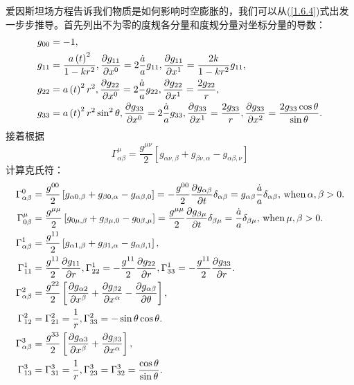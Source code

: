\documentclass[../天体物理基础.tex]{subfiles}
\begin{document}
爱因斯坦场方程告诉我们物质是如何影响时空膨胀的，我们可以从(\ref{1.6.4})式出发一步步推导。首先列出不为零的度规各分量和度规分量对坐标分量的导数：
\begin{align}
g_{00}&=-1,\notag\\
g_{11}&=\frac{a\left(t\right)^{2}}{1-kr^{2}},\frac{\partial{}g_{11}}{\partial{}x^{0}}=2\frac{\dot a}{a}g_{11},\frac{\partial{}g_{11}}{\partial{}x^{1}}=\frac{2k}{1-kr^{2}}g_{11},\notag\\
g_{22}&=a\left(t\right)^{2}r^{2},\frac{\partial{}g_{22}}{\partial{}x^{0}}=2\frac{\dot a}{a}g_{22},\frac{\partial{}g_{22}}{\partial{}x^{1}}=\frac{2g_{22}}{r},\notag\\
g_{33}&=a\left(t\right)^{2}r^{2}\sin^{2}\theta,\frac{\partial{}g_{33}}{\partial{}x^{0}}=2\frac{\dot a}{a}g_{33},\frac{\partial{}g_{33}}{\partial{}x^{1}}=\frac{2g_{33}}{r},\frac{\partial{}g_{33}}{\partial{}x^{2}}=\frac{2g_{33}\cos\theta}{\sin\theta}.\notag
\end{align}
接着根据
\begin{equation}
\Gamma_{\alpha\beta}^\mu=\frac{g^{\mu\nu}}{2}\left[g_{\alpha\nu,\beta}+g_{\beta\nu,\alpha}-g_{\alpha\beta,\nu}\right]
\end{equation}
计算克氏符：
\begin{align}
\Gamma_{\alpha\beta}^0&=\frac{g^{00}}{2}\left[g_{\alpha0,\beta}+g_{\beta0,\alpha}-g_{\alpha\beta,0}\right]=-\frac{g^{00}}{2}\frac{\partial{}g_{\alpha\beta}}{\partial{}t}\delta_{\alpha\beta}=g_{\alpha\beta}\frac{\dot a}{a}\delta_{\alpha\beta},\,\text{when}\,\alpha,\beta>0.\notag\\
\Gamma_{0\beta}^\mu&=\frac{g^{\mu\mu}}{2}\left[g_{0\mu,\beta}+g_{\beta\mu,0}-g_{0\beta,\mu}\right]=\frac{g^{\mu\mu}}{2}\frac{\partial{}g_{\beta\mu}}{\partial{}t}\delta_{\beta\mu}=\frac{\dot a}{a}\delta_{\beta\mu},\,\text{when}\,\mu,\beta>0.\notag\\
\Gamma_{\alpha\beta}^1&=\frac{g^{11}}{2}\left[g_{\alpha1,\beta}+g_{\beta1,\alpha}-g_{\alpha\beta,1}\right],\notag\\
\Gamma_{11}^{1}&=\frac{g^{11}}{2}\frac{\partial{}g_{11}}{\partial{}r},\Gamma_{22}^{1}=-\frac{g^{11}}{2}\frac{\partial{}g_{22}}{\partial{}r},\Gamma_{33}^{1}=-\frac{g^{11}}{2}\frac{\partial{}g_{33}}{\partial{}r}.\notag\\
\Gamma_{\alpha\beta}^{2}&=\frac{g^{22}}{2}\left[\frac{\partial{}g_{\alpha2}}{\partial{}x^\beta}+\frac{\partial{}g_{\beta2}}{\partial{}x^\alpha}-\frac{\partial{}g_{\alpha\beta}}{\partial{}\theta}\right],\notag\\
\Gamma_{12}^{2}&=\Gamma_{21}^{2}=\frac{1}{r},\Gamma_{33}^{2}=-\sin\theta\cos\theta.\notag\\
\Gamma_{\alpha\beta}^{3}&=\frac{g^{33}}{2}\left[\frac{\partial{}g_{\alpha3}}{\partial{}x^\beta}+\frac{\partial{}g_{\beta3}}{\partial{}x^\alpha}\right],\notag\\
\Gamma_{13}^{3}&=\Gamma_{31}^{3}=\frac{1}{r},\Gamma_{23}^{3}=\Gamma_{32}^{3}=\frac{\cos\theta}{\sin\theta}.\notag
\end{align}
\end{document}
